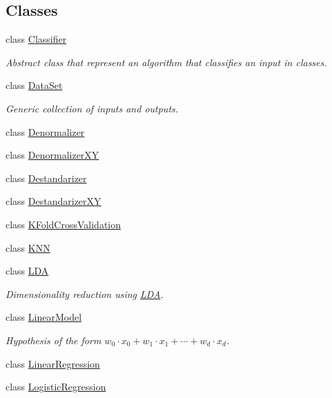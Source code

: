 \subsection*{Classes}
\begin{DoxyCompactItemize}
\item 
class \hyperlink{classhappyml_1_1Classifier}{Classifier}
\begin{DoxyCompactList}\small\item\em Abstract class that represent an algorithm that classifies an input in classes. \end{DoxyCompactList}\item 
class \hyperlink{classhappyml_1_1DataSet}{Data\+Set}
\begin{DoxyCompactList}\small\item\em Generic collection of inputs and outputs. \end{DoxyCompactList}\item 
class \hyperlink{classhappyml_1_1Denormalizer}{Denormalizer}
\item 
class \hyperlink{classhappyml_1_1DenormalizerXY}{Denormalizer\+XY}
\item 
class \hyperlink{classhappyml_1_1Destandarizer}{Destandarizer}
\item 
class \hyperlink{classhappyml_1_1DestandarizerXY}{Destandarizer\+XY}
\item 
class \hyperlink{classhappyml_1_1KFoldCrossValidation}{K\+Fold\+Cross\+Validation}
\item 
class \hyperlink{classhappyml_1_1KNN}{K\+NN}
\item 
class \hyperlink{classhappyml_1_1LDA}{L\+DA}
\begin{DoxyCompactList}\small\item\em Dimensionality reduction using \hyperlink{classhappyml_1_1LDA}{L\+DA}. \end{DoxyCompactList}\item 
class \hyperlink{classhappyml_1_1LinearModel}{Linear\+Model}
\begin{DoxyCompactList}\small\item\em Hypothesis of the form $w_0 \cdot x_0 + w_1 \cdot x_1 + \cdots + w_d \cdot x_d$. \end{DoxyCompactList}\item 
class \hyperlink{classhappyml_1_1LinearRegression}{Linear\+Regression}
\item 
class \hyperlink{classhappyml_1_1LogisticRegression}{Logistic\+Regression}
\item 

\end{DoxyCompactItemize}
